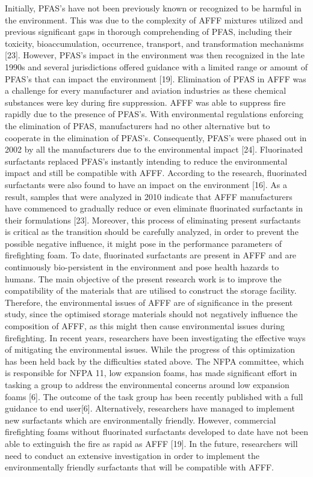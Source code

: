 \documentclass[12pt]{report}
\begin{document}
Initially, PFAS's have not been previously known or recognized to be harmful in the environment. This was due to the complexity of AFFF mixtures utilized and previous significant gaps in thorough comprehending of PFAS, including their toxicity, bioaccumulation, occurrence, transport, and transformation mechanisms [23]. However, PFAS's impact in the environment was then recognized in the late 1990s and several jurisdictions offered guidance with a limited range or amount of PFAS's that can impact the environment [19].
Elimination of PFAS in AFFF was a challenge for every manufacturer and aviation industries as these chemical substances were key during fire suppression. AFFF was able to suppress fire rapidly due to the presence of PFAS's. With environmental regulations enforcing the elimination of PFAS, manufacturers had no other alternative but to cooperate in the elimination of PFAS's. Consequently, PFAS's were phased out in 2002 by all the manufacturers due to the environmental impact [24].  Fluorinated surfactants replaced PFAS's instantly intending to reduce the environmental impact and still be compatible with AFFF. 
According to the research, fluorinated surfactants were also found to have an impact on the environment [16]. As a result, samples that were analyzed in 2010 indicate that AFFF manufacturers have commenced to gradually reduce or even eliminate fluorinated surfactants in their formulations [23]. Moreover, this process of eliminating present surfactants is critical as the transition should be carefully analyzed, in order to prevent the possible negative influence, it might pose in the performance parameters of firefighting foam. To date, fluorinated surfactants are present in AFFF and are continuously bio-persistent in the environment and pose health hazards to humans.
The main objective of the present research work is to improve the compatibility of the materials that are utilised to construct the storage facility. Therefore, the environmental issues of AFFF are of significance in the present study, since the optimised storage materials should not negatively influence the composition of AFFF, as this might then cause environmental issues during firefighting. 
In recent years, researchers have been investigating the effective ways of mitigating the environmental issues. While the progress of this optimization has been held back by the difficulties stated above. The NFPA committee, which is responsible for NFPA 11, low expansion foams, has made significant effort in tasking a group to address the environmental concerns around low expansion foams [6]. The outcome of the task group has been recently published with a full guidance to end user[6]. Alternatively, researchers have managed to implement new surfactants which are environmentally friendly. However, commercial firefighting foams without fluorinated surfactants developed to date have not been able to extinguish the fire as rapid as AFFF [19]. In the future, researchers will need to conduct an extensive investigation in order to implement the environmentally friendly surfactants that will be compatible with AFFF.  
\end{document}
